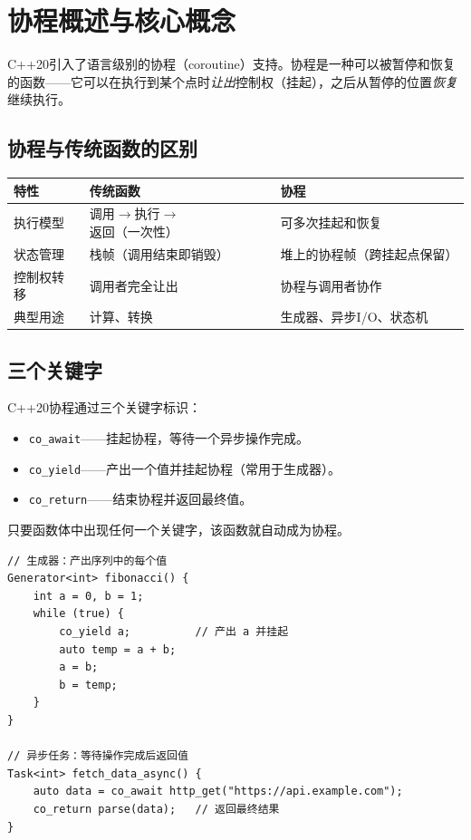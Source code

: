 \documentclass[12pt,a4paper,fontset=fandol]{ctexbook}
\newcommand{\cpp}[1]{C++#1}
\begin{document}
\chapter{协程概述与核心概念}

\cpp{}20引入了语言级别的协程（coroutine）支持。协程是一种可以被暂停和恢复的函数——它可以在执行到某个点时\emph{让出}控制权（挂起），之后从暂停的位置\emph{恢复}继续执行。

\section{协程与传统函数的区别}

\begin{longtable}{lp{6cm}p{5cm}}
\toprule
\textbf{特性} & \textbf{传统函数} & \textbf{协程} \\
\midrule
执行模型 & 调用$\to$执行$\to$返回（一次性） & 可多次挂起和恢复 \\
状态管理 & 栈帧（调用结束即销毁） & 堆上的协程帧（跨挂起点保留） \\
控制权转移 & 调用者完全让出 & 协程与调用者协作 \\
典型用途 & 计算、转换 & 生成器、异步I/O、状态机 \\
\bottomrule
\end{longtable}

\section{三个关键字}

\cpp{}20协程通过三个关键字标识：

\begin{itemize}[nosep]
\item \texttt{co\_await}——挂起协程，等待一个异步操作完成。
\item \texttt{co\_yield}——产出一个值并挂起协程（常用于生成器）。
\item \texttt{co\_return}——结束协程并返回最终值。
\end{itemize}

只要函数体中出现任何一个关键字，该函数就自动成为协程。

\begin{lstlisting}
// 生成器：产出序列中的每个值
Generator<int> fibonacci() {
    int a = 0, b = 1;
    while (true) {
        co_yield a;          // 产出 a 并挂起
        auto temp = a + b;
        a = b;
        b = temp;
    }
}

// 异步任务：等待操作完成后返回值
Task<int> fetch_data_async() {
    auto data = co_await http_get("https://api.example.com");
    co_return parse(data);   // 返回最终结果
}
\end{lstlisting}
\end{document}
